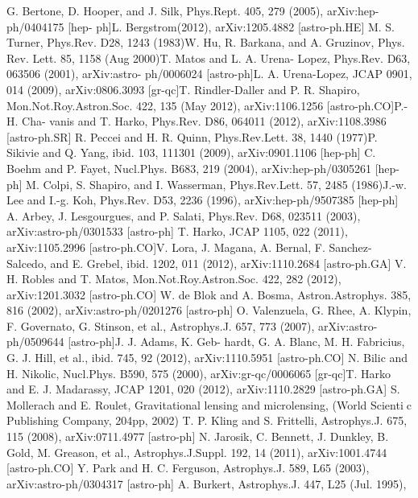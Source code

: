 \documentclass{article}
\begin{document}
\begin{multicols}{2}
\begin{thebibliography}{24}
G. Bertone, D. Hooper, and J. Silk, Phys.Rept.
405, 279 (2005), arXiv:hep-ph/0404175 [hep-
ph]L. Bergstrom(2012), arXiv:1205.4882 [astro-ph.HE]
M. S. Turner, Phys.Rev. D28, 1243 (1983)W. Hu,
R. Barkana, and A. Gruzinov, Phys. Rev. Lett.
85, 1158 (Aug 2000)T. Matos and L. A. Urena-
Lopez, Phys.Rev. D63, 063506 (2001), arXiv:astro-
ph/0006024 [astro-ph]L. A. Urena-Lopez, JCAP 0901,
014 (2009), arXiv:0806.3093 [gr-qc]T. Rindler-Daller
and P. R. Shapiro, Mon.Not.Roy.Astron.Soc. 422, 135
(May 2012), arXiv:1106.1256 [astro-ph.CO]P.-H. Cha-
vanis and T. Harko, Phys.Rev. D86, 064011 (2012),
arXiv:1108.3986 [astro-ph.SR]
R. Peccei and H. R. Quinn, Phys.Rev.Lett. 38, 1440
(1977)P. Sikivie and Q. Yang, ibid. 103, 111301 (2009),
arXiv:0901.1106 [hep-ph]
C. Boehm and P. Fayet, Nucl.Phys. B683, 219 (2004),
arXiv:hep-ph/0305261 [hep-ph]
M. Colpi, S. Shapiro, and I. Wasserman, Phys.Rev.Lett.
57, 2485 (1986)J.-w. Lee and I.-g. Koh, Phys.Rev. D53,
2236 (1996), arXiv:hep-ph/9507385 [hep-ph]
A. Arbey, J. Lesgourgues, and P. Salati, Phys.Rev. D68,
023511 (2003), arXiv:astro-ph/0301533 [astro-ph]
T. Harko, JCAP 1105, 022 (2011), arXiv:1105.2996
[astro-ph.CO]V. Lora, J. Magana, A. Bernal, F. Sanchez-
Salcedo, and E. Grebel, ibid. 1202, 011 (2012),
arXiv:1110.2684 [astro-ph.GA]
V. H. Robles and T. Matos, Mon.Not.Roy.Astron.Soc.
422, 282 (2012), arXiv:1201.3032 [astro-ph.CO]
W. de Blok and A. Bosma, Astron.Astrophys. 385, 816
(2002), arXiv:astro-ph/0201276 [astro-ph]
O. Valenzuela, G. Rhee, A. Klypin, F. Governato,
G. Stinson, et al., Astrophys.J. 657, 773 (2007),
arXiv:astro-ph/0509644 [astro-ph]J. J. Adams, K. Geb-
hardt, G. A. Blanc, M. H. Fabricius, G. J. Hill, et al.,
ibid. 745, 92 (2012), arXiv:1110.5951 [astro-ph.CO]
N. Bilic and H. Nikolic, Nucl.Phys. B590, 575
(2000), arXiv:gr-qc/0006065 [gr-qc]T. Harko and E. J.
Madarassy, JCAP 1201, 020 (2012), arXiv:1110.2829
[astro-ph.GA]
S. Mollerach and E. Roulet, Gravitational lensing and
microlensing, (World Scientic Publishing Company,
204pp, 2002)
T. P. Kling and S. Frittelli, Astrophys.J. 675, 115 (2008),
arXiv:0711.4977 [astro-ph]
N. Jarosik, C. Bennett, J. Dunkley, B. Gold,
M. Greason, et al., Astrophys.J.Suppl. 192, 14 (2011),
arXiv:1001.4744 [astro-ph.CO]
Y. Park and H. C. Ferguson, Astrophys.J. 589, L65
(2003), arXiv:astro-ph/0304317 [astro-ph]
 A. Burkert, Astrophys.J. 447, L25 (Jul. 1995),

\end{thebibliography}
\end{multicols}
\end{document}
